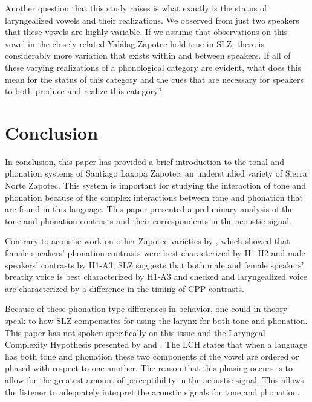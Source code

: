 \documentclass[12pt, letterpaper]{article}
\begin{document}
Another question that this study raises is what exactly is the status of laryngealized vowels and their realizations. We observed from just two speakers that these vowels are highly variable. If we assume that  observations on this vowel in the closely related Yalálag Zapotec hold true in SLZ, there is considerably more variation that exists within and between speakers. If all of these varying realizations of a phonological category are evident, what does this mean for the status of this category and the cues that are necessary for speakers to both produce and realize this category? 

\section{Conclusion} \label{sec:Conclusion}

In conclusion, this paper has provided a brief introduction to the tonal and phonation systems of Santiago Laxopa Zapotec, an understudied variety of Sierra Norte Zapotec. This system is important for studying the interaction of tone and phonation because of the complex interactions between tone and phonation that are found in this language. This paper presented a preliminary analysis of the tone and phonation contrasts and their correspondents in the acoustic signal. 

Contrary to acoustic work on other Zapotec varieties by \citet{espositoVariationContrastivePhonation2010}, which showed that female speakers' phonation contrasts were best characterized by H1-H2 and male speakers' contrasts by H1-A3, SLZ suggests that both male and female speakers' breathy voice is best characterized by H1-A3 and checked and laryngealized voice are characterized by a difference in the timing of CPP contrasts. 

Because of these phonation type differences in behavior, one could in theory speak to how SLZ compensates for using the larynx for both tone and phonation. This paper has not spoken specifically on this issue and the Laryngeal Complexity Hypothesis presented by \citet{silvermanLaryngealComplexityOtomanguean1997} and \citet{blankenshipTimeCourseBreathiness1997, blankenshipTimingNonmodalPhonation2002}. The LCH states that when a language has both tone and phonation these two components of the vowel are ordered or phased with respect to one another. The reason that this phasing occurs is to allow for the greatest amount of perceptibility in the acoustic signal. This allows the listener to adequately interpret the acoustic signals for tone and phonation. 
\end{document}
